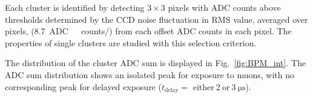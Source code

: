 \documentclass[preprint,3p,twocolumn]{elsarticle}
\begin{document}
Each cluster is identified by detecting $3 \times 3$ pixels with
ADC counts above thresholds determined by the CCD noise
fluctuation in RMS value, averaged over pixels, (\SI{8.7}{ADC{~}counts/\pixel}) from each offset ADC counts in each pixel. The properties of single
clusters are studied with this selection criterion.

%
The distribution of the cluster ADC sum is displayed in
Fig.~\ref{fig:BPM_int}.  The ADC sum distribution shows an
isolated peak for exposure to muons, with no corresponding peak
for delayed exposure
($t_{\text{delay}} =$ either$~2~$or$~\SI{3}{\micro\s}$).
\end{document}
